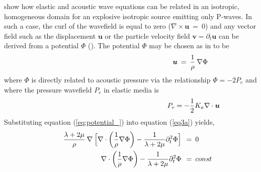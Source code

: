\documentclass{article}
\begin{document}
	
	\textcite{cance2015validity} show how elastic and acoustic wave equations can be related in an isotropic, homogeneous domain for an explosive isotropic source emitting only P-waves. In such a case, the curl of the wavefield is equal to zero ($\nabla \times \bm{u} \: = \: 0$) and any vector field such as the displacement $\bm{u}$ or the particle velocity field $\bm{v}= \partial_{t} \bm{u}$  can be derived from a potential $\Phi$ (\cite{kaufman2000acoustic}). The potential $\Phi$ may be chosen as in \textcite{cance2015validity} to be
	\begin{align}\label{eq:potential_}
		\shoveright \shoveright \shoveright \shoveright \shoveright \shoveright  \shoveright \shoveright  \shoveright  \shoveright  \shoveright \shoveright  \shoveright  \shoveright \shoveright \shoveright  \shoveright  \shoveright
		\bm{u} \: &=\: \frac{1}{\rho} \: \nabla \Phi
	\end{align}
	where $\Phi$ is directly related to acoustic pressure via the relationship $\Phi = -2 P_{e}$ and where the pressure wavefield $P_{e}$ in elastic media is %
	\begin{align}\label{eq:press_el}
		\shoveright \shoveright \shoveright \shoveright \shoveright \shoveright  \shoveright \shoveright  \shoveright  \shoveright  \shoveright \shoveright  \shoveright  \shoveright \shoveright \shoveright  \shoveright  \shoveright
		P_{e} = -\frac{1}{2} K_{a} \nabla \cdot \bm{u}
	\end{align}
	Substituting equation (\ref{eq:potential_}) into equation (\ref{eq3a}) yields,
	\begin{align}
		\shoveright  \shoveright  
		\frac{\lambda + 2 \mu}{\rho} \: \nabla \: \Big[  \nabla \cdot \bigg( \frac{1}{\rho} \nabla \Phi \bigg) - \frac{1}{\lambda + 2 \mu} \partial_{t}^{2} \Phi \Big] \:\: &= \: 0 \label{eq_el_ac1} \\ 
		\nabla \cdot \bigg( \frac{1}{\rho} \nabla \Phi \bigg) - \frac{1}{\lambda + 2 \mu} \partial_{t}^{2} \Phi \:\: & = \: const \label{eq_el_ac2}
	\end{align} 
\end{document}
